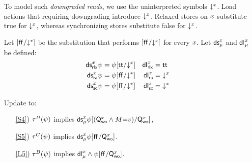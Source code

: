 To model such \emph{downgraded reads}, we use the uninterpreted symbols
$\mathord{\downarrow^{x}}$.  Load actions that requiring downgrading introduce $\mathord{\downarrow^{x}}$.
Relaxed stores on $x$ substitute true for $\mathord{\downarrow^{x}}$, whereas
synchronizing stores substitute false for $\mathord{\downarrow^{x}}$.

\begin{definition}
  \label{def:DS}
  Let $[\mkern.6mu\mathsf{ff}\mkern.6mu/\mathord{\downarrow^{\mathtt{*}}}]$ be the substitution that performs $[\mkern.6mu\mathsf{ff}\mkern.6mu/\mathord{\downarrow^{x}}]$
  for every $x$.
  Let $\DS{\aLoc}{\amode}$ and $\mathsf{dl}_{\mu}^{x}$ be defined:
  \begin{align*}
    \mathsf{ds}_{{\mathsf{rlx}}}^{x}\psi&=\psi[\mathsf{tt}/\mathord{\downarrow^{x}}] 
    &\mathsf{dl}_{{\mathsf{rlx}}}^{x}&=\mathsf{tt}
    \\
    \mathsf{ds}_{{\mathsf{ra}}}^{x}\psi&=\psi[\mkern.6mu\mathsf{ff}\mkern.6mu/\mathord{\downarrow^{\mathtt{*}}}]
    &\mathsf{dl}_{{\mathsf{ra}}}^{x}&=\mathord{\downarrow^{x}}
    \\
    \mathsf{ds}_{{\mathsf{sc}}}^{x}\psi&=\psi[\mkern.6mu\mathsf{ff}\mkern.6mu/\mathord{\downarrow^{\mathtt{*}}}]
    &\mathsf{dl}_{{\mathsf{sc}}}^{x}&=\mathord{\downarrow^{x}}
  \end{align*}
\end{definition}

\begin{definition}[$\xCO$/$\xRASC$/$\xDGR$]
  \label{def:pomsets-down}
  Update  to:
  \begin{enumerate}
  \item[\ref{S4})]
    $\aTr{\bEvs}{\bForm}$ implies $\mathsf{ds}_{\mu}^{x}\psi[(\mathsf{Q}_{\mathsf{wo}}^{x}\land M{=}v)/\mathsf{Q}_{\mathsf{wo}}^{x}]$,
  \item[\ref{S5})]
    $\aTr{\cEvs}{\bForm}$ implies $\mathsf{ds}_{\mu}^{x}\psi[\mkern.6mu\mathsf{ff}\mkern.6mu/\mathsf{Q}_{\mathsf{wo}}^{x}]$.
  \item[\ref{L5})]
    $\aTr{\dEvs}{\bForm}$ implies $\mathsf{dl}_{\mu}^{x} \land\psi[\mkern.6mu\mathsf{ff}\mkern.6mu/\mathsf{Q}_{\mathsf{wo}}^{x}]$.
  \end{enumerate}
\end{definition}

